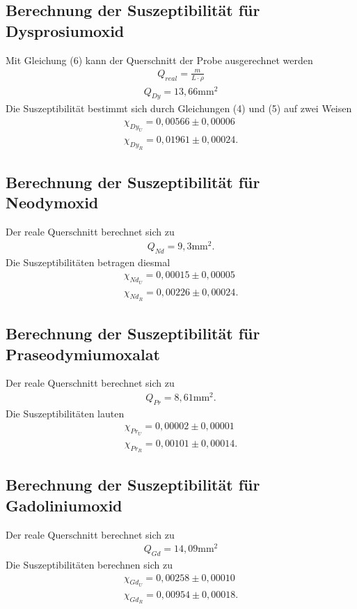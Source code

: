 \subsection{Berechnung der Suszeptibilität für Dysprosiumoxid}
Mit Gleichung (6) kann der Querschnitt der Probe ausgerechnet werden
\begin{align}
Q_{real} = \frac{m}{L \cdot \rho}
\end{align}
\begin{align*}
Q_{Dy} = 13,66 \si{\milli\meter}^2
\end{align*}
Die Suszeptibilität bestimmt sich durch Gleichungen (4) und (5) auf zwei Weisen
\begin{align*}
\chi_{Dy_U} = 0,00566 \pm 0,00006 \\
\chi_{Dy_R} = 0,01961 \pm 0,00024 .
\end{align*}

\subsection{Berechnung der Suszeptibilität für Neodymoxid}
Der reale Querschnitt berechnet sich zu
\begin{align*}
Q_{Nd} = 9,3 \si{\milli\meter}^2.
\end{align*}
Die Suszeptibilitäten betragen diesmal
\begin{align*}
\chi_{Nd_U} = 0,00015 \pm 0,00005 \\
\chi_{Nd_R} = 0,00226 \pm 0,00024 .
\end{align*}

\subsection{Berechnung der Suszeptibilität für Praseodymiumoxalat}
Der reale Querschnitt berechnet sich zu
\begin{align*}
Q_{Pr} = 8,61 \si{\milli\meter}^2.
\end{align*}
Die Suszeptibilitäten lauten
\begin{align*}
\chi_{Pr_U} = 0,00002 \pm 0,00001 \\
\chi_{Pr_R} = 0,00101 \pm 0,00014 .
\end{align*}

\subsection{Berechnung der Suszeptibilität für Gadoliniumoxid}
Der reale Querschnitt berechnet sich zu
\begin{align*}
Q_{Gd} = 14,09 \si{\milli\meter}^2
\end{align*}
Die Suszeptibilitäten berechnen sich zu
\begin{align*}
\chi_{Gd_U} = 0,00258 \pm 0,00010 \\
\chi_{Gd_R} = 0,00954 \pm 0,00018 .
\end{align*}


